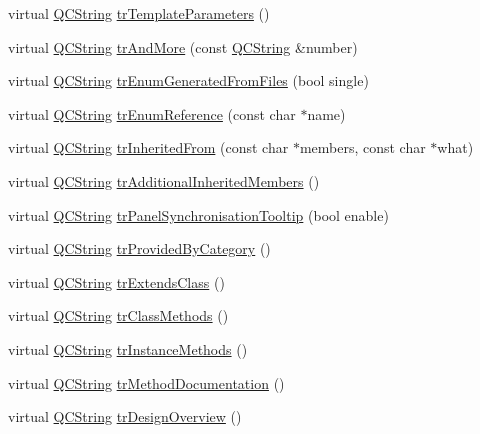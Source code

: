 \begin{DoxyCompactItemize}
\item 
virtual \mbox{\hyperlink{class_q_c_string}{Q\+C\+String}} \mbox{\hyperlink{class_translator_ukrainian_afa432bd736d633ea09fd1cecc65740fe}{tr\+Template\+Parameters}} ()
\item 
virtual \mbox{\hyperlink{class_q_c_string}{Q\+C\+String}} \mbox{\hyperlink{class_translator_ukrainian_a82cf3218b9d254cc206fccec2c2ef0a9}{tr\+And\+More}} (const \mbox{\hyperlink{class_q_c_string}{Q\+C\+String}} \&number)
\item 
virtual \mbox{\hyperlink{class_q_c_string}{Q\+C\+String}} \mbox{\hyperlink{class_translator_ukrainian_a58493a08dfdbdaa5ad41d185401efd59}{tr\+Enum\+Generated\+From\+Files}} (bool single)
\item 
virtual \mbox{\hyperlink{class_q_c_string}{Q\+C\+String}} \mbox{\hyperlink{class_translator_ukrainian_a4cfb282f21f2875417c10a5ff452be67}{tr\+Enum\+Reference}} (const char $\ast$name)
\item 
virtual \mbox{\hyperlink{class_q_c_string}{Q\+C\+String}} \mbox{\hyperlink{class_translator_ukrainian_a740f2dd240558051c14ceddcf2671dbf}{tr\+Inherited\+From}} (const char $\ast$members, const char $\ast$what)
\item 
virtual \mbox{\hyperlink{class_q_c_string}{Q\+C\+String}} \mbox{\hyperlink{class_translator_ukrainian_afb64f5fb5e9a8fd3ac37982e7a6e2e84}{tr\+Additional\+Inherited\+Members}} ()
\item 
virtual \mbox{\hyperlink{class_q_c_string}{Q\+C\+String}} \mbox{\hyperlink{class_translator_ukrainian_a93af584a0ed0f80b5bfc2ada251c3873}{tr\+Panel\+Synchronisation\+Tooltip}} (bool enable)
\item 
virtual \mbox{\hyperlink{class_q_c_string}{Q\+C\+String}} \mbox{\hyperlink{class_translator_ukrainian_abdfb29338a413be33c4ca735d8706a79}{tr\+Provided\+By\+Category}} ()
\item 
virtual \mbox{\hyperlink{class_q_c_string}{Q\+C\+String}} \mbox{\hyperlink{class_translator_ukrainian_a5e746b819ffd15c130c4f3551f14e5c7}{tr\+Extends\+Class}} ()
\item 
virtual \mbox{\hyperlink{class_q_c_string}{Q\+C\+String}} \mbox{\hyperlink{class_translator_ukrainian_a6c99105ef53492ef8df03788bb417727}{tr\+Class\+Methods}} ()
\item 
virtual \mbox{\hyperlink{class_q_c_string}{Q\+C\+String}} \mbox{\hyperlink{class_translator_ukrainian_aab99123524ff8c75f60722970ad7fa18}{tr\+Instance\+Methods}} ()
\item 
virtual \mbox{\hyperlink{class_q_c_string}{Q\+C\+String}} \mbox{\hyperlink{class_translator_ukrainian_a8fffc63b4ecc05655aab521768bdcd2c}{tr\+Method\+Documentation}} ()
\item 
virtual \mbox{\hyperlink{class_q_c_string}{Q\+C\+String}} \mbox{\hyperlink{class_translator_ukrainian_a2973da75e1865102a7420f1c13c38532}{tr\+Design\+Overview}} ()
\end{DoxyCompactItemize}
